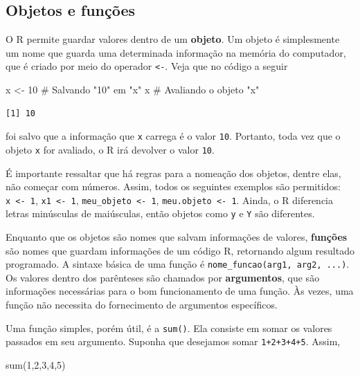 \documentclass[
  12pt,
  letterpaper,
  DIV=11,
  numbers=noendperiod]{scrreprt}
\newenvironment{Shaded}{\begin{snugshade}}{\end{snugshade}}
\newcommand{\CommentTok}[1]{\textcolor[rgb]{0.37,0.37,0.37}{#1}}
\newcommand{\DecValTok}[1]{\textcolor[rgb]{0.68,0.00,0.00}{#1}}
\newcommand{\FunctionTok}[1]{\textcolor[rgb]{0.28,0.35,0.67}{#1}}
\newcommand{\NormalTok}[1]{\textcolor[rgb]{0.00,0.23,0.31}{#1}}
\newcommand{\OtherTok}[1]{\textcolor[rgb]{0.00,0.23,0.31}{#1}}
\theoremstyle{definition}
\theoremstyle{exemplo}
\begin{document}
\subsection{Objetos e funções}\label{objetos-e-funuxe7uxf5es}

O R permite guardar valores dentro de um \textbf{objeto}. Um objeto é
simplesmente um nome que guarda uma determinada informação na memória do
computador, que é criado por meio do operador \texttt{\textless{}-}.
Veja que no código a seguir

\begin{Shaded}
\begin{Highlighting}[]
\NormalTok{x }\OtherTok{\textless{}{-}} \DecValTok{10} \CommentTok{\# Salvando "10" em "x"}
\NormalTok{x       }\CommentTok{\# Avaliando o objeto "x"}
\end{Highlighting}
\end{Shaded}

\begin{verbatim}
[1] 10
\end{verbatim}

\noindent foi salvo que a informação que \texttt{x} carrega é o valor
\texttt{10}. Portanto, toda vez que o objeto \texttt{x} for avaliado, o
R irá devolver o valor \texttt{10}.

É importante ressaltar que há regras para a nomeação dos objetos, dentre
elas, não começar com números. Assim, todos os seguintes exemplos são
permitidos: \texttt{x\ \textless{}-\ 1}, \texttt{x1\ \textless{}-\ 1},
\texttt{meu\_objeto\ \textless{}-\ 1},
\texttt{meu.objeto\ \textless{}-\ 1}. Ainda, o R diferencia letras
minúsculas de maiúsculas, então objetos como \texttt{y} e \texttt{Y} são
diferentes.

Enquanto que os objetos são nomes que salvam informações de valores,
\textbf{funções} são nomes que guardam informações de um código R,
retornando algum resultado programado. A sintaxe básica de uma função é
\texttt{nome\_funcao(arg1,\ arg2,\ ...)}. Os valores dentro dos
parênteses são chamados por \textbf{argumentos}, que são informações
necessárias para o bom funcionamento de uma função. Às vezes, uma função
não necessita do fornecimento de argumentos específicos.

Uma função simples, porém útil, é a \texttt{sum()}. Ela consiste em
somar os valores passados em seu argumento. Suponha que desejamos somar
\texttt{1+2+3+4+5}. Assim,

\begin{Shaded}
\begin{Highlighting}[]
\FunctionTok{sum}\NormalTok{(}\DecValTok{1}\NormalTok{,}\DecValTok{2}\NormalTok{,}\DecValTok{3}\NormalTok{,}\DecValTok{4}\NormalTok{,}\DecValTok{5}\NormalTok{)}
\end{Highlighting}
\end{Shaded}
\end{document}
